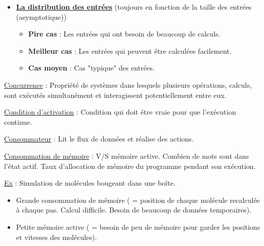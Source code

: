 \documentclass[fr,license=none,skiptoc]{../../../eplsummary}
\newcommand{\bigO}{\ensuremath{\mathcal{O}}}
\begin{document}
\begin{flushleft}
\begin{itemize}
\begin{itemize} [label=\textbullet, font=\MEDIUM]
\item \textbf{Notation big-$\Theta$} : Équivalence asymptotique (borne supérieure et inférieure).
$$f(n) \in \Theta (g(n)) \text{  si  } f(n) \in \bigO (g(n))  \text{  \underline{et}  } f(n) \in \Omega (g(n))$$


\end{itemize} \smallbreak

\item \underline{\textbf {La distribution des entrées}} (toujours en fonction de la taille des entrées (asymptotique))


\begin{itemize} [label=\textbullet, font=\MEDIUM]
\item \textbf{Pire cas} : Les entrées qui ont besoin de beaucoup de calculs.
\item \textbf{Meilleur cas} : Les entrées qui peuvent être calculées facilement.
\item \textbf{Cas moyen} : Cas "typique" des entrées.
\end{itemize}

\end{itemize} \bigbreak


\textcolor{mauvedef}{\underline{Concurrence}} : Propriété de systèmes dans lesquels plusieurs opérations, calculs, sont exécutés simultanément et interagissent potentiellement entre eux.\bigbreak


\textcolor{mauvedef}{\underline{Condition d’activation}} : Condition qui doit être vraie pour que l’exécution continue. \bigbreak


\textcolor{mauvedef}{\underline{Consommateur}} : Lit le flux de données et réalise des actions. \bigbreak


\textcolor{mauvedef}{\underline{Consommation de mémoire}} : V/S mémoire active. Combien de mots sont dans l'état actif. Taux d'allocation de mémoire du programme pendant son exécution.

\underline{Ex} : Simulation de molécules bougeant dans une boîte.

\begin{itemize}
\item Grande consommation de mémoire ( = position de chaque molécule recalculée à chaque pas. Calcul difficile. Besoin de beaucoup de données temporaires).
\item Petite mémoire active ( = besoin de peu de mémoire pour garder les positions et vitesses des molécules).
\end{itemize} \bigbreak



\end{flushleft}
\end{document}
